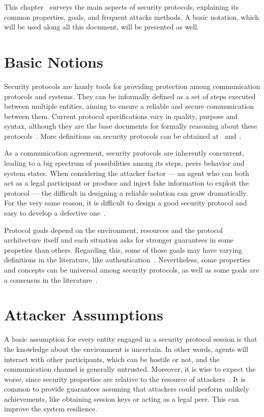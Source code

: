 This chapter~\label{chap:sec-protocols} surveys the main aspects of security protocols, explaining its common properties, goals, and frequent attacks methods. A basic notation, which will be used along all this document, will be presented as well.





\section{Basic Notions}
Security protocols are handy tools for providing protection among communication protocols and systems. They can be informally defined as a set of steps executed between multiple entities, aiming to ensure a reliable and secure communication between them. Current protocol specifications vary in quality, purpose and syntax, although they are the base documents for formally reasoning about these protocols~\cite{Abadi99}. More definitions on security protocols can be obtained at~\cite{BoydMathuria2008} and~\cite{RyanSchneider2010}.

As a communication agreement, security protocols are inherently concurrent, leading to a big spectrum of possibilities among its steps, peers behavior and system states. When considering the attacker factor --- an agent who can both act as a legal participant or produce and inject fake information to exploit the protocol --- the difficult in designing a reliable solution can grow dramatically. For the very same reason, it is difficult to design a good security protocol and easy to develop a defective one~\cite{Bella2007}.

Protocol goals depend on the environment, resources and the protocol architecture itself and each situation asks for stronger guarantees in some propeties than others. Regarding this, some of those goals may have varying definitions in the literature, like authentication~\cite{Abadi99}. Nevertheless, some properties and concepts can be universal among security protocols, as well as some goals are a consensus in the literature~\cite{RyanSchneider2010}.





\section{Attacker Assumptions}
A basic assumption for every entity engaged in a security protocol session is that the knowledge about the environment is uncertain. In other words, agents will interact with other participants, which can be hostile or not, and the communication channel is generally untrusted. Moreover, it is wise to expect the worse, since security properties are relative to the resource of attackers~\cite{BoydMathuria2008}. It is common to provide guarantees assuming that attackers could perform unlikely achievements, like obtaining session keys or acting as a legal peer. This can improve the system resilience.

